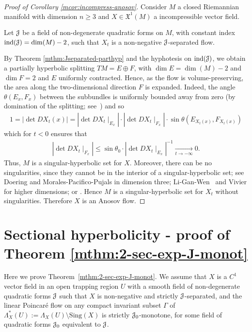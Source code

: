 \documentclass[12pt,reqno]{amsart}
\numberwithin{equation}{section}
\theoremstyle{plain}
\theoremstyle{definition}
\newcommand{\indi}{\operatorname{ind}}
\newcommand{\sing}{\mathrm{Sing}}
\newcommand{\J}{\EuScript{J}}
\newcommand{\Mundo}{\mathfrak{X}^{1}(M)}
\begin{document}
\begin{proof}[Proof of Corollary \ref{mcor:incompress-anosov}]
  Consider $M$ a closed Riemannian manifold with dimension
  $n \geq 3$ and $X \in \Mundo$ a incompressible vector
  field.

  Let $\J$ be a field of non-degenerate quadratic forms on
  $M$, with constant index $\indi (\J)=\dim (M)-2$, such
  that $X_t$ is a non-negative $\J$-separated flow.

  By Theorem \ref{mthm:Jseparated-parthyp} and the
  hyphotesis on $\indi (\J)$, we obtain a partially
  hyperbolic splitting $TM = E \oplus F$, with $\dim E
  =\dim(M) - 2$ and $\dim F=2$ and $E$ uniformly
  contracted. Hence, as the flow is volume-preserving, the
  area along the two-dimensional direction $F$ is
  expanded. Indeed, the angle $\theta(E_x,F_x)$ between the
  subbundles is uniformly bounded away from zero (by
  domination of the splitting; see~\cite{Newhouse2004}) and
  so
  \begin{align*}
    1=|\det DX_t(x)| = |\det DX_t\mid_{E_x}|\cdot|\det
    DX_t\mid_{F_x}|\cdot \sin \theta(E_{X_t(x)} ,F_{X_t(x)})
   \end{align*}
  which for $t<0$ ensures that
  \begin{align*}
    |\det DX_t\mid_{F_x}|\le \sin\theta_0
    \cdot|\det DX_t\mid_{E_x}|^{-1}\xrightarrow[t\to-\infty]{}0.
  \end{align*}
  Thus, $M$ is a singular-hyperbolic set for $X$. Moreover,
  there can be no singularities, since they cannot be in the
  interior of a singular-hyperbolic set; see Doering
  \cite{Do87} and Morales-Pacifico-Pujals \cite{MPP99} in
  dimension three; Li-Gan-Wen~\cite{LGW05} and Vivier
  \cite{Viv03} for higher dimensions; or \cite[Chapter
  4]{AraPac2010}. Hence $M$ is a singular-hyperbolic set for
  $X_t$ without singularities. Therefore $X$ is an Anosov
  flow.
\end{proof}




\section{Sectional hyperbolicity - proof of Theorem
  \ref{mthm:2-sec-exp-J-monot}}
\label{sec:approach-via-linear}

Here we prove Theorem~\ref{mthm:2-sec-exp-J-monot}.  We
assume that $X$ is a $C^1$ vector field in an open trapping
region $U$ with a smooth field of non-degenerate
quadratic forms $\J$ such that $X$ is non-negative and strictly
$\J$-separated, and the linear Poincar\'e flow on any
compact invariant subset $\Gamma$ of
$\Lambda^*_X(U):=\Lambda_X(U)\setminus \sing(X)$ is strictly
$\J_0$-monotone, for some field of quadratic forms $\J_0$
equivalent to $\J$.
\end{document}
